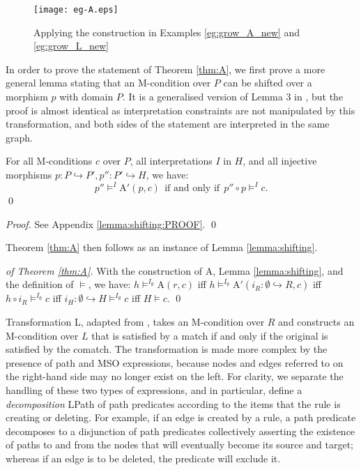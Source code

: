 \documentclass{llncs}
\begin{document}
\begin{figure}[htb]
	\centering
	\texttt{[image: eg-A.eps]}
	\caption{Applying the construction in Examples \ref{eg:grow_A_new} and \ref{eg:grow_L_new}}\label{fig:eg-A-L}
\end{figure}






In order to prove the statement of Theorem \ref{thm:A}, we first prove a more general lemma stating that an M-condition over $P$ can be shifted over a morphism $p$ with domain $P$. It is a generalised version of Lemma 3 in \cite{Habel-Pennemann09a}, but the proof is almost identical as interpretation constraints are not manipulated by this transformation, and both sides of the statement are interpreted in the same graph.

\begin{lemma}\rm\label{lemma:shifting}
	For all M-conditions $c$ over $P$, all interpretations $I$ in $H$, and all injective morphisms $p\!: P\hookrightarrow P', p''\!: P'\hookrightarrow H$, we have:
	\[ p'' \models^{I} \text{A}'(p,c)\ \ \text{if and only if}\ \ p'' \circ p \models^{I} c. \]
	\qed
\end{lemma}

\begin{proof}
	See Appendix \ref{lemma:shifting:PROOF}.
	\qed
\end{proof}

Theorem \ref{thm:A} then follows as an instance of Lemma \ref{lemma:shifting}.

\begin{proof}[of Theorem \ref{thm:A}]
	With the construction of A, Lemma \ref{lemma:shifting}, and the definition of $\models$, we have: $h \models^{I_\emptyset} \text{A}(r,c)$ iff $h \models^{I_\emptyset} \text{A}'(i_R\!:\emptyset \hookrightarrow R, c)$ iff $ h \circ i_R \models^{I_\emptyset} c$ iff $i_H\!:\emptyset\hookrightarrow H \models^{I_\emptyset} c$ iff $H \models c$.
	\qed
\end{proof}


Transformation L, adapted from \cite{Habel-Pennemann09a}, takes an M-condition over $R$ and constructs an M-condition over $L$ that is satisfied by a match if and only if the original is satisfied by the comatch. The transformation is made more complex by the presence of path and MSO expressions, because nodes and edges referred to on the right-hand side may no longer exist on the left. For clarity, we separate the handling of these two types of expressions, and in particular, define a \emph{decomposition} LPath of path predicates according to the items that the rule is creating or deleting. For example, if an edge is created by a rule, a path predicate decomposes to a disjunction of path predicates collectively asserting the existence of paths to and from the nodes that will eventually become its source and target; whereas if an edge is to be deleted, the predicate will exclude it.
\end{document}
